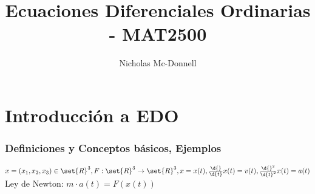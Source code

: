 \documentclass{notetaking}
\title{Ecuaciones Diferenciales Ordinarias - MAT2500}
\author{Nicholas Mc-Donnell}
\date{}
\begin{document}
\maketitle
\tableofcontents
\newpage

\part{Introducción a EDO}
\section{Definiciones y Conceptos básicos, Ejemplos}
\begin{ejm}
    \(x=(x_1,x_2,x_3)\in\set{R}^3,F:\set{R}^3\rightarrow\set{R}^3, x=x(t), \frac{\d{}}{\d{t}}x(t)=v(t),\frac{\d{}^2}{\d{t}^2}x(t)=a(t)\)\\
    Ley de Newton: \(m\cdot a(t)=F(x(t))\)
\end{ejm}
\end{document}
